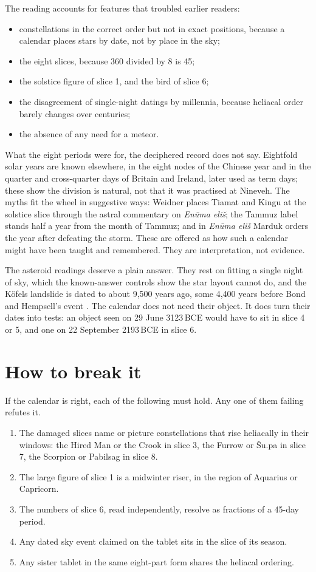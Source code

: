 \documentclass[11pt]{article}
\begin{document}
The reading accounts for features that troubled earlier readers:
\begin{itemize}
\item constellations in the correct order but not in exact positions, because a calendar places stars by date, not by place in the sky;
\item the eight slices, because 360 divided by 8 is 45;
\item the solstice figure of slice 1, and the bird of slice 6;
\item the disagreement of single-night datings by millennia, because heliacal order barely changes over centuries;
\item the absence of any need for a meteor.
\end{itemize}

What the eight periods were for, the deciphered record does not say. Eightfold solar years are known
elsewhere, in the eight nodes of the Chinese year and in the quarter and cross-quarter days of
Britain and Ireland, later used as term days; these show the division is natural, not that it was
practised at Nineveh. The myths fit the wheel in suggestive ways: Weidner places Tiamat and Kingu at
the solstice slice through the astral commentary on \emph{Enūma eliš}; the Tammuz label stands half a
year from the month of Tammuz; and in \emph{Enūma eliš} Marduk orders the year after defeating the storm.
These are offered as how such a calendar might have been taught and remembered. They are
interpretation, not evidence.

The asteroid readings deserve a plain answer. They rest on fitting a single night of sky, which the
known-answer controls show the star layout cannot do, and the Köfels landslide is dated to about
9{,}500 years ago, some 4{,}400 years before Bond and Hempsell's event \cite{nicolussi2015}. The
calendar does not need their object. It does turn their dates into tests: an object seen on
29 June 3123\,BCE would have to sit in slice 4 or 5, and one on 22 September 2193\,BCE in slice 6.

\section{How to break it}

If the calendar is right, each of the following must hold. Any one of them failing refutes it.
\begin{enumerate}
\item The damaged slices name or picture constellations that rise heliacally in their windows: the Hired Man or the Crook in slice 3, the Furrow or Šu.pa in slice 7, the Scorpion or Pabilsag in slice 8.
\item The large figure of slice 1 is a midwinter riser, in the region of Aquarius or Capricorn.
\item The numbers of slice 6, read independently, resolve as fractions of a 45-day period.
\item Any dated sky event claimed on the tablet sits in the slice of its season.
\item Any sister tablet in the same eight-part form shares the heliacal ordering.
\end{enumerate}
\end{document}

